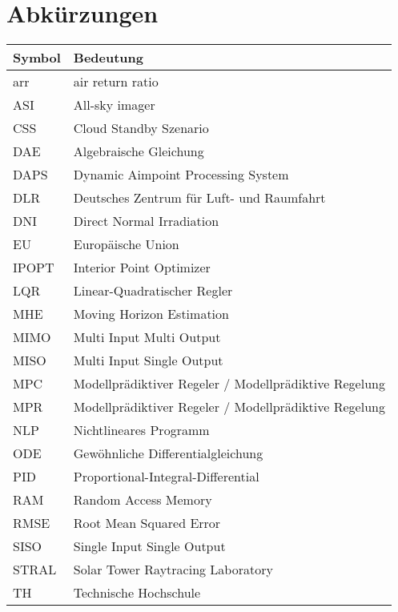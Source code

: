 \section*{Abkürzungen}
\begin{table}[ht!]
    \centering
\begin{tabular}{m{}m{}}
        \rowcolor{white}
Symbol & Bedeutung                                 \\
        \midrule
arr    & air return ratio \\
ASI     & All-sky imager                     \\
CSS     & Cloud Standby Szenario                    \\
DAE     & Algebraische Gleichung                    \\
DAPS     & Dynamic Aimpoint Processing System                     \\
DLR     & Deutsches Zentrum für Luft- und Raumfahrt                    \\
DNI     & Direct Normal Irradiation                     \\
EU     & Europäische Union                     \\
IPOPT     & Interior Point Optimizer                     \\
LQR     & Linear-Quadratischer Regler                    \\
MHE     & Moving Horizon Estimation                     \\
MIMO     & Multi Input Multi Output                     \\
MISO     & Multi Input Single Output                     \\
MPC     & Modellprädiktiver Regeler / Modellprädiktive Regelung                     \\
MPR     & Modellprädiktiver Regeler / Modellprädiktive Regelung                     \\
NLP     & Nichtlineares Programm                     \\
ODE     & Gewöhnliche Differentialgleichung                     \\
PID     & Proportional-Integral-Differential                     \\
RAM     & Random Access Memory                     \\
RMSE     & Root Mean Squared Error                     \\
SISO     & Single Input Single Output                     \\
STRAL     & Solar Tower Raytracing Laboratory                     \\
TH     & Technische Hochschule                     \\
    \end{tabular}
\end{table}
\clearpage
\newpage

